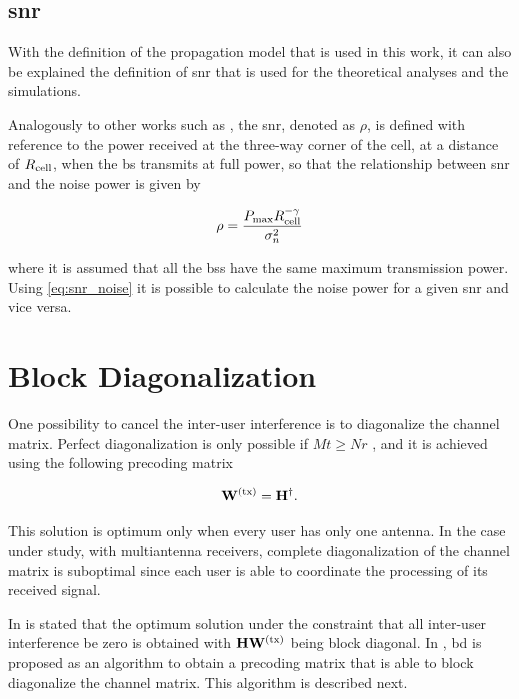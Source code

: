 \subsection{\gls{snr}} \label{ssec:snr}

With the definition of the propagation model that is used in this work, it can
also be explained the definition of \gls{snr} that is used for the theoretical
analyses and the simulations.

Analogously to other works such as \cite{zhang09}, the \gls{snr}, denoted as
$\rho$, is defined with reference to the power received at the three-way corner
of the cell, at a distance of $R_{\text{cell}}$, when the \gls{bs} transmits at
full power, so that the relationship between \gls{snr} and the noise power is
given by

\begin{equation} \label{eq:snr_noise}
    \rho = \frac{P_{\max}R_{\text{cell}}^{-\gamma}}{\sigma_n^2}
\end{equation}

\noindent
where it is assumed that all the \glspl{bs} have the same maximum transmission
power. Using \eqref{eq:snr_noise} it is possible to calculate the noise power
for a given \gls{snr} and vice versa.

\section{Block Diagonalization}\label{sec:bd}

One possibility to cancel the inter-user interference is to diagonalize the
channel matrix. Perfect diagonalization is only possible if $Mt \geq Nr$
\cite{caire03}, and it is achieved using the following precoding matrix

\begin{equation} \label{eq:zf_precod}
    \mathbf{W}^{(\text{tx})} = \mathbf{H}^\dagger.
\end{equation}

This solution is optimum only when every user has only one antenna. In the case
under study, with multiantenna receivers, complete diagonalization of the
channel matrix is suboptimal since each user is able to coordinate the
processing of its received signal.

In \cite{spencer04} is stated that the optimum solution under the constraint
that all inter-user interference be zero is obtained with $\mathbf{H} \mathbf{W}^{(\text{tx})}$ being
block diagonal. In \cite{spencer04}, \gls{bd} is proposed as an algorithm to
obtain a precoding matrix that is able to block diagonalize the channel matrix.
This algorithm is described next.

